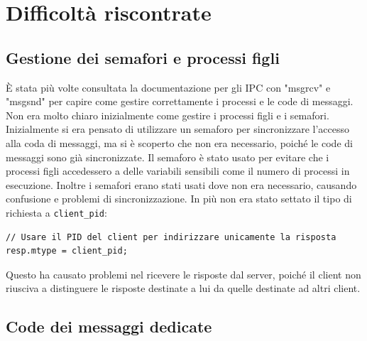 \documentclass[a4paper]{article}
\begin{document}
\section{Difficoltà riscontrate}

\subsection{Gestione dei semafori e processi figli}

È stata più volte consultata la documentazione per gli IPC con "msgrcv" e "msgsnd" per capire come
gestire correttamente i processi e le code di messaggi.
Non era molto chiaro inizialmente come gestire i processi figli e i semafori.
Inizialmente si era pensato di utilizzare un semaforo per sincronizzare l'accesso alla coda di messaggi,
ma si è scoperto che non era necessario, poiché le code di messaggi sono già sincronizzate.
Il semaforo è stato usato per evitare che i processi figli accedessero a delle variabili sensibili come
il numero di processi in esecuzione. Inoltre i semafori erano stati usati dove 
non era necessario, causando confusione e problemi di sincronizzazione.
In più non era stato settato il tipo di richiesta a \texttt{client\_pid}:
\begin{verbatim}
// Usare il PID del client per indirizzare unicamente la risposta
resp.mtype = client_pid;  
\end{verbatim}
\noindent
Questo ha causato problemi nel ricevere le risposte dal server, poiché il client non riusciva
a distinguere le risposte destinate a lui da quelle destinate ad altri client.


\subsection{Code dei messaggi dedicate}
\end{document}
